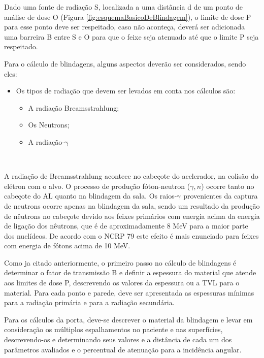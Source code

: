 \documentclass[11pt,a4paper]{article}
\begin{document}
        Dado uma fonte de radiação S, localizada a uma distância d de um ponto de análise de dose O (Figura \ref{fig:esquemaBasicoDeBlindagem}), o limite de dose P para esse ponto deve ser respeitado, caso não aconteça, deverá ser adicionada uma barreira B entre S e O para que o feixe seja atenuado até que o limite P seja respeitado.
        
        Para o cálculo de blindagens, alguns aspectos deverão ser considerados, sendo eles:

        \begin{itemize}
            \item Os tipos de radiação que devem ser levados em conta nos cálculos são:
                \begin{itemize}
                     \item A radiação Breamsstrahlung; 
                     \item Os Neutrons;
                     \item A radiação-$\mathrm{\gamma}$
                \end{itemize}
            \end{itemize}
        
            \

            A radiação de Breamsstrahlung acontece no cabeçote do acelerador, na colisão do elétron com o alvo.
            O processo de produção fóton-neutron ($\gamma, n$) ocorre tanto no cabeçote do AL quanto na blindagem da sala.
            Os raios-$\mathrm{\gamma}$ provenientes da captura de neutrons ocorre apenas na blindagem da sala, sendo um resultado da produção de nêutrons no cabeçote devido aos feixes primários com energia acima da energia de ligação dos nêutrons, que é de aproximadamente 8 MeV para a maior parte dos nuclídeos. De acordo com o NCRP 79 este efeito é mais enunciado para feixes com energia de fótons acima de 10 MeV.
            

            Como ja citado anteriormente, o primeiro passo no cálculo de blindagens é determinar o fator de transmissão B e definir a espessura do material que atende aos limites de dose P, descrevendo os valores da espessura ou a TVL para o material. Para cada ponto e parede, deve ser apresentada as espessuras mínimas para a radiação primária e para a radiação secundária.

            Para os cálculos da porta, deve-se descrever o material da blindagem e levar em consideração os múltiplos espalhamentos no paciente e nas superfícies, descrevendo-os e determinando seus valores e a distância de cada um dos parâmetros avaliados e o percentual de atenuação para a incidência angular.
\end{document}
